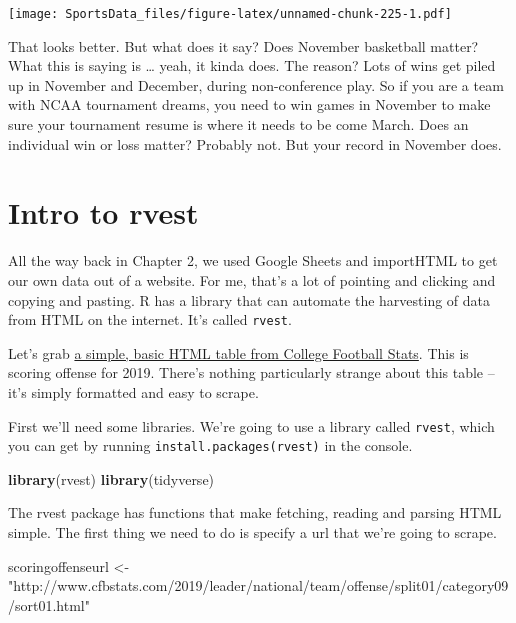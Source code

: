 \documentclass[]{book}
\newenvironment{Shaded}{\begin{snugshade}}{\end{snugshade}}
\newcommand{\KeywordTok}[1]{\textcolor[rgb]{0.13,0.29,0.53}{\textbf{#1}}}
\newcommand{\NormalTok}[1]{#1}
\newcommand{\StringTok}[1]{\textcolor[rgb]{0.31,0.60,0.02}{#1}}
\begin{document}
\texttt{[image: SportsData\_files/figure-latex/unnamed-chunk-225-1.pdf]}

That looks better. But what does it say? Does November basketball matter? What this is saying is \ldots{} yeah, it kinda does. The reason? Lots of wins get piled up in November and December, during non-conference play. So if you are a team with NCAA tournament dreams, you need to win games in November to make sure your tournament resume is where it needs to be come March. Does an individual win or loss matter? Probably not. But your record in November does.

\hypertarget{intro-to-rvest}{%
\chapter{Intro to rvest}\label{intro-to-rvest}}

All the way back in Chapter 2, we used Google Sheets and importHTML to get our own data out of a website. For me, that's a lot of pointing and clicking and copying and pasting. R has a library that can automate the harvesting of data from HTML on the internet. It's called \texttt{rvest}.

Let's grab \href{http://www.cfbstats.com/2019/leader/national/team/offense/split01/category09/sort01.html}{a simple, basic HTML table from College Football Stats}. This is scoring offense for 2019. There's nothing particularly strange about this table -- it's simply formatted and easy to scrape.

First we'll need some libraries. We're going to use a library called \texttt{rvest}, which you can get by running \texttt{install.packages(\textquotesingle{}rvest\textquotesingle{})} in the console.

\begin{Shaded}
\begin{Highlighting}[]
\KeywordTok{library}\NormalTok{(rvest)}
\KeywordTok{library}\NormalTok{(tidyverse)}
\end{Highlighting}
\end{Shaded}

The rvest package has functions that make fetching, reading and parsing HTML simple. The first thing we need to do is specify a url that we're going to scrape.

\begin{Shaded}
\begin{Highlighting}[]
\NormalTok{scoringoffenseurl <-}\StringTok{ "http://www.cfbstats.com/2019/leader/national/team/offense/split01/category09/sort01.html"}
\end{Highlighting}
\end{Shaded}
\end{document}
